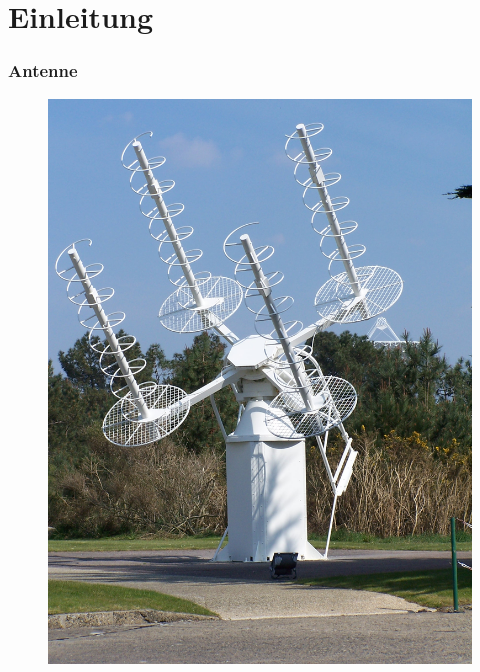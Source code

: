 

\subtitle{Technik 11: \\
  Antennentechnik \\[2em]}
\date{Stand 18.09.2017}


\section*{Einleitung}

\begin{frame}
  \frametitle{Antenne}
  \begin{center}
    \begin{figure}
      \includegraphics[width=.5\textwidth,height=.7\textheight,keepaspectratio]{e11/Traqueur_acquisition.JPG}
    \end{figure}
  \end{center}
\end{frame}

